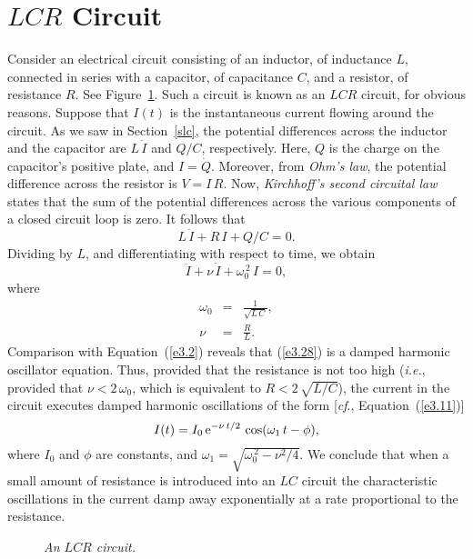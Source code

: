 \section{$LCR$ Circuit}
Consider an electrical circuit consisting of an inductor, of inductance $L$, connected
in series with a capacitor, of capacitance $C$, and a resistor, of resistance $R$. See Figure~\ref{f3.2}. Such
a circuit is known as an $LCR$ circuit, for obvious reasons. Suppose that
$I(t)$ is the instantaneous current flowing around the circuit. As we saw in Section~\ref{slc}, the potential differences across the inductor and the capacitor are
$L\,\dot{I}$ and $Q/C$, respectively. Here,  $Q$ is the charge on the capacitor's positive plate, and $I=\dot{Q}$. Moreover, from {\em Ohm's law}, the potential difference across the resistor is $V=I\,R$. Now, {\em Kirchhoff's second circuital law}\/ states that  the sum of the potential differences across the
various components of a closed circuit loop is zero. It follows that
\begin{equation}\label{e3.29}
L\,\dot{I} + R\,I + Q/C=0.
\end{equation}
Dividing by $L$, and differentiating with respect to time, we obtain
\begin{equation}\label{e3.28}
\ddot{I} + \nu\,\dot{I} + \omega_0^{\,2}\,I=0,
\end{equation}
where
\begin{eqnarray}
\omega_0 &=& \frac{1}{\sqrt{L\,C}},\label{e3.31}\\[0.5ex]
\nu &=& \frac{R}{L}.\label{e3.32}
\end{eqnarray}
Comparison with Equation~(\ref{e3.2}) reveals that (\ref{e3.28})
is a damped harmonic oscillator equation. Thus,  provided that the
resistance is not too high ({\em i.e.}, provided that $\nu<2\,\omega_0$, which is equivalent to $R<2\,\sqrt{L/C}$), the current
in the circuit executes damped harmonic oscillations of the form [{\em cf}., Equation~(\ref{e3.11})]
\begin{equation}
I(t) = I_0\,{\rm e}^{-\nu\,t/2}\,\cos(\omega_1\,t-\phi),
\end{equation}
where $I_0$ and $\phi$ are constants, and $\omega_1=\sqrt{\omega_0^{\,2}-\nu^2/4}$.
We conclude that when a small amount of resistance is introduced into an $LC$ circuit  the characteristic  oscillations in the current damp away exponentially
at a rate proportional to the resistance.
 
\begin{figure}
\epsfysize=2.5in
\centerline{}
\caption{\em An $LCR$ circuit.}\label{f3.2}   
\end{figure}


